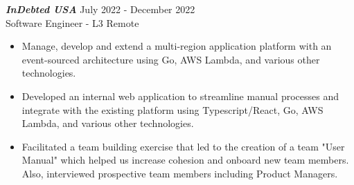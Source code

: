 {\sl \textbf{InDebted USA}} \hfill July 2022 - December 2022 \\ Software Engineer - L3 \hfill Remote
\begin{itemize}
    \item Manage, develop and extend a multi-region application platform with an event-sourced architecture using Go, AWS Lambda, and various other technologies.
    \item Developed an internal web application to streamline manual processes and integrate with the existing platform using Typescript/React, Go, AWS Lambda, and various other technologies.
    \item Facilitated a team building exercise that led to the creation of a team "User Manual" which helped us increase cohesion and onboard new team members. Also, interviewed prospective team members including Product Managers.
\end{itemize}

